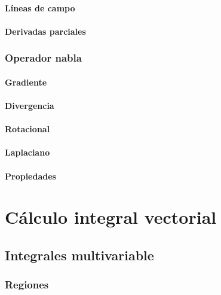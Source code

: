 \documentclass[12pt, fleqn]{report}                             %
\begin{document}
            \subsection{Líneas de campo}
            
            \subsection{Derivadas parciales}
        
        \section{Operador nabla}
        
            \subsection{Gradiente}
            
            \subsection{Divergencia}
            
            \subsection{Rotacional}
            
            \subsection{Laplaciano}
            
            \subsection{Propiedades}



\part{Cálculo integral vectorial}

    \chapter{Integrales multivariable}
    
        \section{Regiones}
        
\end{document}
